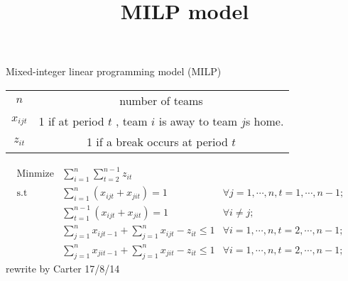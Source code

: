 \documentclass[12pt,oneside]{book}
\title{MILP model}
\begin{document}
\begin{center} 
Mixed-integer linear programming model (MILP)\\
\begin{tabular}{c c}
\hline
$n$ & number of teams\\
$x_{ijt}$ & 1 if at period $t$ , team $i$ is away to team $j$s home.\\
$z_{it}$ & 1 if a break occurs at period $t$\\
\hline
\end{tabular}
\end{center}

\begin{align}
\textrm{Minmize} & \sum_{i=1}^{n} \sum_{t=2}^{n-1} z_{it} \\
\textrm{s.t} & \sum_{i=1}^{n}(x_{ijt}+x_{jit})=1 & \forall j=1,\cdots,n,   t=1,\cdots,n-1; & \\
 & \sum_{t=1}^{n-1}(x_{ijt}+x_{jit})=1 & \forall i \neq j; \\
 &  \sum_{j=1}^{n}x_{ijt-1}+\sum_{j=1}^{n}x_{ijt}-z_{it} \leq1 & \forall i=1,\cdots,n, t=2,\cdots,n-1; \\
  &  \sum_{j=1}^{n}x_{jit-1}+\sum_{j=1}^{n}x_{jit}-z_{it} \leq1 & \forall i=1,\cdots,n, t=2,\cdots,n-1;
\end{align}
\hfill{rewrite by Carter  17/8/14}
\end{document}
